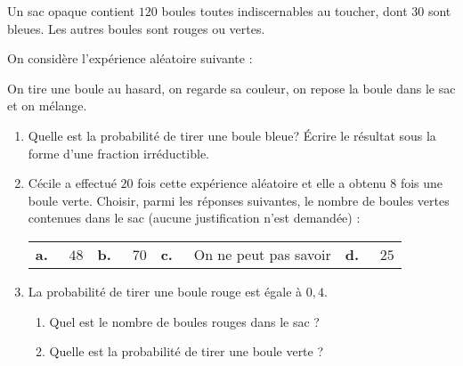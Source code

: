 
\medskip

Un sac opaque contient $120$ boules toutes indiscernables au toucher, dont 30 sont bleues. Les autres boules sont rouges ou vertes.

On considère l'expérience aléatoire suivante :

On tire une boule au hasard, on regarde sa couleur, on repose la boule dans le sac et on mélange.

\medskip

\begin{enumerate}
\item Quelle est la probabilité de tirer une boule bleue? Écrire le résultat sous la forme d'une fraction irréductible.
\item Cécile a effectué $20$ fois cette expérience aléatoire et elle a obtenu $8$ fois une boule verte. Choisir, parmi les réponses suivantes, le nombre de boules vertes contenues dans le sac (aucune justification n'est demandée) :

\medskip
\begin{tabularx}{\linewidth}{*{4}{X}}
\textbf{a.~~} $48$ &\textbf{b.~~} $70$ &\textbf{c.~~} On ne peut pas savoir &\textbf{d.~~} $25$
\end{tabularx}
\medskip

\item  La probabilité de tirer une boule rouge est égale à $0,4$.
	\begin{enumerate}
		\item Quel est le nombre de boules rouges dans le sac ?
		\item Quelle est la probabilité de tirer une boule verte ?
	\end{enumerate}
\end{enumerate}

\vspace{0,5cm}

